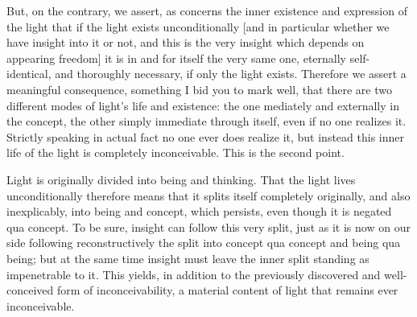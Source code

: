 But, on the contrary, we assert,
as concerns the inner existence and
expression of the light
that if the light exists unconditionally
[and in particular whether we have insight into it or not,
and this is the very insight which depends on appearing freedom]
it is in and for itself the very same one,
eternally self-identical, and thoroughly necessary,
if only the light exists.
Therefore we assert a meaningful consequence,
something I bid you to mark well,
that there are two different modes
of light’s life and existence:
the one mediately and externally in the concept,
the other simply immediate through itself,
even if no one realizes it.
Strictly speaking in actual fact
no one ever does realize it,
but instead this inner life of the light is
completely inconceivable.
This is the second point.

Light is originally divided into being and thinking.
That the light lives unconditionally therefore means
that it splits itself completely originally,
and also inexplicably, into being and concept,
which persists, even though it is negated qua concept.
To be sure, insight can follow this very split,
just as it is now on our side following reconstructively
the split into concept qua concept and being qua being;
but at the same time insight must leave the inner
split standing as impenetrable to it.
This yields, in addition to the previously
discovered and well-conceived form of inconceivability,
a material content of light that remains ever inconceivable.


